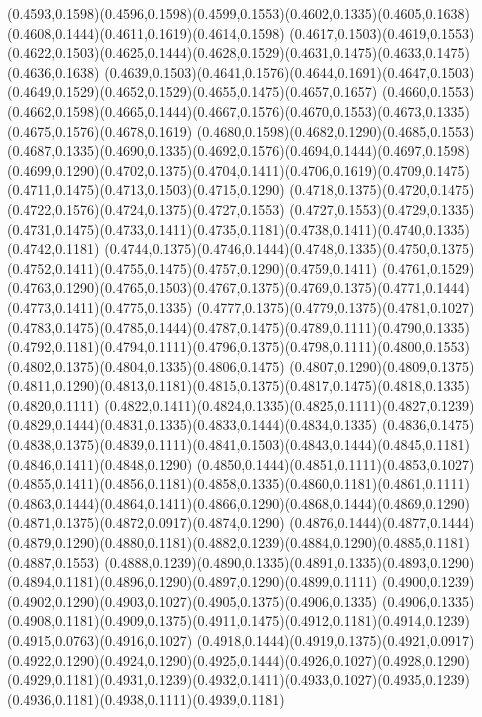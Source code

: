 (0.4593,0.1598)(0.4596,0.1598)(0.4599,0.1553)(0.4602,0.1335)(0.4605,0.1638)(0.4608,0.1444)(0.4611,0.1619)(0.4614,0.1598)
(0.4617,0.1503)(0.4619,0.1553)(0.4622,0.1503)(0.4625,0.1444)(0.4628,0.1529)(0.4631,0.1475)(0.4633,0.1475)(0.4636,0.1638)
(0.4639,0.1503)(0.4641,0.1576)(0.4644,0.1691)(0.4647,0.1503)(0.4649,0.1529)(0.4652,0.1529)(0.4655,0.1475)(0.4657,0.1657)
(0.4660,0.1553)(0.4662,0.1598)(0.4665,0.1444)(0.4667,0.1576)(0.4670,0.1553)(0.4673,0.1335)(0.4675,0.1576)(0.4678,0.1619)
(0.4680,0.1598)(0.4682,0.1290)(0.4685,0.1553)(0.4687,0.1335)(0.4690,0.1335)(0.4692,0.1576)(0.4694,0.1444)(0.4697,0.1598)
(0.4699,0.1290)(0.4702,0.1375)(0.4704,0.1411)(0.4706,0.1619)(0.4709,0.1475)(0.4711,0.1475)(0.4713,0.1503)(0.4715,0.1290)
(0.4718,0.1375)(0.4720,0.1475)(0.4722,0.1576)(0.4724,0.1375)(0.4727,0.1553)
\PST@Solid(0.4727,0.1553)(0.4729,0.1335)(0.4731,0.1475)(0.4733,0.1411)(0.4735,0.1181)(0.4738,0.1411)(0.4740,0.1335)(0.4742,0.1181)
(0.4744,0.1375)(0.4746,0.1444)(0.4748,0.1335)(0.4750,0.1375)(0.4752,0.1411)(0.4755,0.1475)(0.4757,0.1290)(0.4759,0.1411)
(0.4761,0.1529)(0.4763,0.1290)(0.4765,0.1503)(0.4767,0.1375)(0.4769,0.1375)(0.4771,0.1444)(0.4773,0.1411)(0.4775,0.1335)
(0.4777,0.1375)(0.4779,0.1375)(0.4781,0.1027)(0.4783,0.1475)(0.4785,0.1444)(0.4787,0.1475)(0.4789,0.1111)(0.4790,0.1335)
(0.4792,0.1181)(0.4794,0.1111)(0.4796,0.1375)(0.4798,0.1111)(0.4800,0.1553)(0.4802,0.1375)(0.4804,0.1335)(0.4806,0.1475)
(0.4807,0.1290)(0.4809,0.1375)(0.4811,0.1290)(0.4813,0.1181)(0.4815,0.1375)(0.4817,0.1475)(0.4818,0.1335)(0.4820,0.1111)
(0.4822,0.1411)(0.4824,0.1335)(0.4825,0.1111)(0.4827,0.1239)(0.4829,0.1444)(0.4831,0.1335)(0.4833,0.1444)(0.4834,0.1335)
(0.4836,0.1475)(0.4838,0.1375)(0.4839,0.1111)(0.4841,0.1503)(0.4843,0.1444)(0.4845,0.1181)(0.4846,0.1411)(0.4848,0.1290)
(0.4850,0.1444)(0.4851,0.1111)(0.4853,0.1027)(0.4855,0.1411)(0.4856,0.1181)(0.4858,0.1335)(0.4860,0.1181)(0.4861,0.1111)
(0.4863,0.1444)(0.4864,0.1411)(0.4866,0.1290)(0.4868,0.1444)(0.4869,0.1290)(0.4871,0.1375)(0.4872,0.0917)(0.4874,0.1290)
(0.4876,0.1444)(0.4877,0.1444)(0.4879,0.1290)(0.4880,0.1181)(0.4882,0.1239)(0.4884,0.1290)(0.4885,0.1181)(0.4887,0.1553)
(0.4888,0.1239)(0.4890,0.1335)(0.4891,0.1335)(0.4893,0.1290)(0.4894,0.1181)(0.4896,0.1290)(0.4897,0.1290)(0.4899,0.1111)
(0.4900,0.1239)(0.4902,0.1290)(0.4903,0.1027)(0.4905,0.1375)(0.4906,0.1335)
\PST@Solid(0.4906,0.1335)(0.4908,0.1181)(0.4909,0.1375)(0.4911,0.1475)(0.4912,0.1181)(0.4914,0.1239)(0.4915,0.0763)(0.4916,0.1027)
(0.4918,0.1444)(0.4919,0.1375)(0.4921,0.0917)(0.4922,0.1290)(0.4924,0.1290)(0.4925,0.1444)(0.4926,0.1027)(0.4928,0.1290)
(0.4929,0.1181)(0.4931,0.1239)(0.4932,0.1411)(0.4933,0.1027)(0.4935,0.1239)(0.4936,0.1181)(0.4938,0.1111)(0.4939,0.1181)
